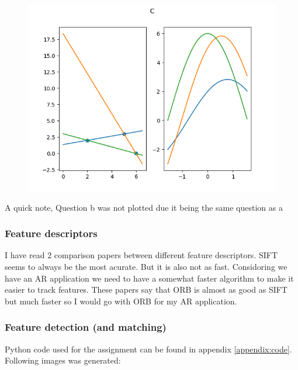 \documentclass{article}
\begin{document}
    \begin{figure}[H]
        \centering
        \includegraphics[width=1\textwidth]{Finished/HoughB.png}
    \end{figure}
    A quick note, Question b was not plotted due it being the same question as a
    \subsubsection{Feature descriptors}
    I have read 2 comparison papers between different feature descriptors. SIFT seems to always be the most acurate.
    But it is also not as fast. Considoring we have an AR application we need to have a somewhat faster algorithm
    to make it easier to track features. These papers say that ORB is almost as good as SIFT but much faster so I would
    go with ORB for my AR application. \cite{art1} \cite{tareen2018comparative}
    \subsubsection{Feature detection (and matching)}
    Python code used for the assignment can be found in appendix \ref{appendix:code}.
    Following images was generated:
\end{document}
